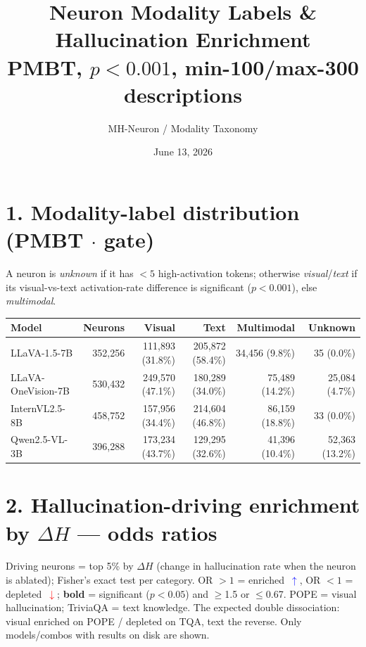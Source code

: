 \documentclass[11pt,a4paper]{article}
\title{Neuron Modality Labels \& Hallucination Enrichment\\[0.3em]
\large PMBT, $p<0.001$, min-100/max-300 descriptions}
\author{MH-Neuron / Modality Taxonomy}
\date{June 13, 2026}
\newcommand{\up}{\,\textcolor{blue}{$\uparrow$}}
\newcommand{\dn}{\,\textcolor{red}{$\downarrow$}}
\begin{document}
\maketitle

\section*{1. Modality-label distribution (PMBT $\cdot$ gate)}
A neuron is \emph{unknown} if it has $<5$ high-activation tokens; otherwise
\emph{visual}/\emph{text} if its visual-vs-text activation-rate difference is
significant ($p<0.001$), else \emph{multimodal}.

\begin{center}
\begin{tabular}{l r r r r r}
\toprule
Model & Neurons & Visual & Text & Multimodal & Unknown \\
\midrule
LLaVA-1.5-7B & 352,256 & 111,893 (31.8\%) & 205,872 (58.4\%) & 34,456 (9.8\%) & 35 (0.0\%) \\
LLaVA-OneVision-7B & 530,432 & 249,570 (47.1\%) & 180,289 (34.0\%) & 75,489 (14.2\%) & 25,084 (4.7\%) \\
InternVL2.5-8B & 458,752 & 157,956 (34.4\%) & 214,604 (46.8\%) & 86,159 (18.8\%) & 33 (0.0\%) \\
Qwen2.5-VL-3B & 396,288 & 173,234 (43.7\%) & 129,295 (32.6\%) & 41,396 (10.4\%) & 52,363 (13.2\%) \\
\bottomrule
\end{tabular}
\end{center}

\section*{2. Hallucination-driving enrichment by $\Delta H$ --- odds ratios}
Driving neurons = top 5\% by $\Delta H$ (change in hallucination rate when the
neuron is ablated); Fisher's exact test per category. OR $>1$ = enriched \up,
OR $<1$ = depleted \dn; \textbf{bold} = significant ($p<0.05$) and $\ge$1.5 or
$\le$0.67. POPE = visual hallucination; TriviaQA = text knowledge. The expected
double dissociation: visual enriched on POPE / depleted on TQA, text the
reverse. Only models/combos with results on disk are shown.
\end{document}
